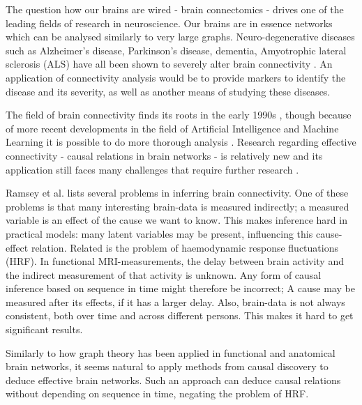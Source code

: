 \documentclass[a4paper, 10pt, english, onecolumn]{article}
\begin{document}
The question how our brains are wired - brain connectomics - drives one of the leading fields of research in neuroscience.
Our brains are in essence networks which can be analysed similarly to very large graphs.
Neuro-degenerative diseases such as Alzheimer's disease, Parkinson's disease, dementia, Amyotrophic lateral sclerosis (ALS) have all been shown to severely alter brain connectivity \cite{Bullmore2009}.
An application of connectivity analysis would be to provide markers to identify the disease and its severity, as well as another means of studying these diseases.

The field of brain connectivity finds its roots in the early 1990s \cite{friston1993functional, friston1994}, though because of more recent developments in the field of Artificial Intelligence and Machine Learning it is possible to do more thorough analysis \cite{vandenheuvel2010}.
Research regarding effective connectivity - causal relations in brain networks - is relatively new and its application still faces many challenges that require further research \cite{ramsey2010}.



Ramsey et al. lists several problems in inferring brain connectivity.
One of these problems is that many interesting brain-data is measured indirectly; a measured variable is an effect of the cause we want to know.
This makes inference hard in practical models: many latent variables may be present, influencing this cause-effect relation.
Related is the problem of haemodynamic response fluctuations (HRF).
In functional MRI-measurements, the delay between brain activity and the indirect measurement of that activity is unknown. %
Any form of causal inference based on sequence in time might therefore be incorrect; A cause may be measured after its effects, if it has a larger delay.
Also, brain-data is not always consistent, both over time and across different persons. This makes it hard to get significant results.

Similarly to how graph theory has been applied in functional and anatomical brain networks, it seems natural to apply methods from causal discovery to deduce effective brain networks.
Such an approach can deduce causal relations without depending on sequence in time, negating the problem of HRF.
\end{document}

